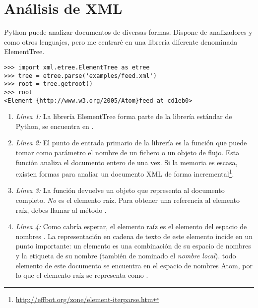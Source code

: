 \section{Análisis de XML}

Python puede analizar documentos  de diversas formas. Dispone de analizadores  y  como otros lenguajes, pero me centraré en una librería diferente denominada ElementTree.

\noindent\begin{minipage}{\textwidth}
\begin{lstlisting}[mathescape=True]
>>> import xml.etree.ElementTree as etree
>>> tree = etree.parse('examples/feed.xml')
>>> root = tree.getroot()
>>> root
<Element {http://www.w3.org/2005/Atom}feed at cd1eb0>
\end{lstlisting}
\end{minipage}

\begin{enumerate}

\item \emph{Línea 1:} La librería ElementTree forma parte de la librería estándar de Python, se encuentra en .

\item \emph{Línea 2:} El punto de entrada primario de la librería es la función  que puede tomar como parámetro el nombre de un fichero o un objeto de flujo. Esta función analiza el documento entero de una vez. Si la memoria es escasa, existen formas para analiar un documento XML de forma incremental\footnote{\href{http://effbot.org/zone/element-iterparse.htm}{http://effbot.org/zone/element-iterparse.htm}}.

\item \emph{Línea 3:} La función  devuelve un objeto que representa al documento completo. \emph{No} es el elemento raíz. Para obtener una referencia al elemento raíz, debes llamar al método .

\item \emph{Línea 4:} Como cabría esperar, el elemento raíz es el elemento  del espacio de nombres . La representación en cadena de texto de este elemento incide en un punto importante: un elemento  es una combinación de su espacio de nombres y la etiqueta de su nombre (también de nominado el \emph{nombre local}). todo elemento de este documento se encuentra en el espacio de nombres Atom, por lo que el elemento raíz se representa como .

\end{enumerate}

